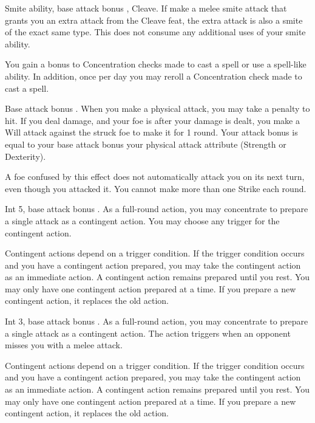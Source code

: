 \featpre Smite ability, base attack bonus , Cleave.
\featben If make a melee smite attack that grants you an extra attack from the Cleave feat, the extra attack is also a smite of the exact same type. This does not consume any additional uses of your smite ability.

 You gain a  bonus to Concentration checks made to cast a spell or use a spell-like ability. In addition, once per day you may reroll a Concentration check made to cast a spell.

\featpre Base attack bonus .
\featben When you make a physical attack, you may take a  penalty to hit. If you deal damage, and your foe is \bloodied after your damage is dealt, you make a Will attack against the struck foe to make it \confused for 1 round. Your attack bonus is equal to your base attack bonus \add your physical attack attribute (Strength or Dexterity).

A foe confused by this effect does not automatically attack you on its next turn, even though you attacked it. You cannot make more than one Strike each round.

\featpre Int 5, base attack bonus .
\featben As a full-round action, you may concentrate to prepare a single attack as a contingent action. You may choose any trigger for the contingent action.

Contingent actions depend on a trigger condition. If the trigger condition occurs and you have a contingent action prepared, you may take the contingent action as an immediate action. A contingent action remains prepared until you rest. You may only have one contingent action prepared at a time. If you prepare a new contingent action, it replaces the old action.

\featpre Int 3, base attack bonus .
\featben As a full-round action, you may concentrate to prepare a single attack as a contingent action. The action triggers when an opponent misses you with a melee attack.

Contingent actions depend on a trigger condition. If the trigger condition occurs and you have a contingent action prepared, you may take the contingent action as an immediate action. A contingent action remains prepared until you rest. You may only have one contingent action prepared at a time. If you prepare a new contingent action, it replaces the old action.

